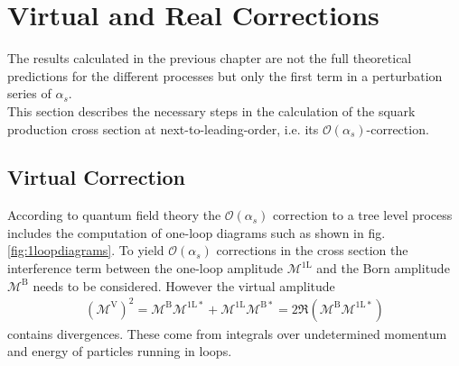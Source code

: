 \section{Virtual and Real Corrections}\label{sec:VirtRealCorr}
The results calculated in the previous chapter are not the full theoretical predictions for the different processes but only the first term in a perturbation series of $\alpha_s$.\\
This section describes the necessary steps in the calculation of the squark production cross section at next-to-leading-order, i.e. its $\mathcal{O}(\alpha_s)$-correction.\\


\subsection{Virtual Correction}
According to quantum field theory the $\mathcal{O}(\alpha_s)$ correction to a tree level process includes the computation of one-loop diagrams such as shown in fig. \ref{fig:1loopdiagrams}. To yield $\mathcal{O}(\alpha_s)$ corrections in the cross section the interference term between the one-loop amplitude $\mathcal{M}^{\mathrm{1L}}$ and the Born amplitude $\mathcal{M}^{\mathrm{B}}$ needs to be considered. However the virtual amplitude 
\begin{align}
\left( \mathcal{M}^{\mathrm{V}} \right)^2 = \mathcal{M}^{\mathrm{B}} \mathcal{M}^{\mathrm{1L}\ast} + \mathcal{M}^{\mathrm{1L}} \mathcal{M}^{\mathrm{B}\ast} = 2 \Re \left( \mathcal{M}^{\mathrm{B}} \mathcal{M}^{\mathrm{1L}\ast} \right)
\end{align}
contains divergences. These come from integrals over undetermined momentum and energy of particles running in loops.

